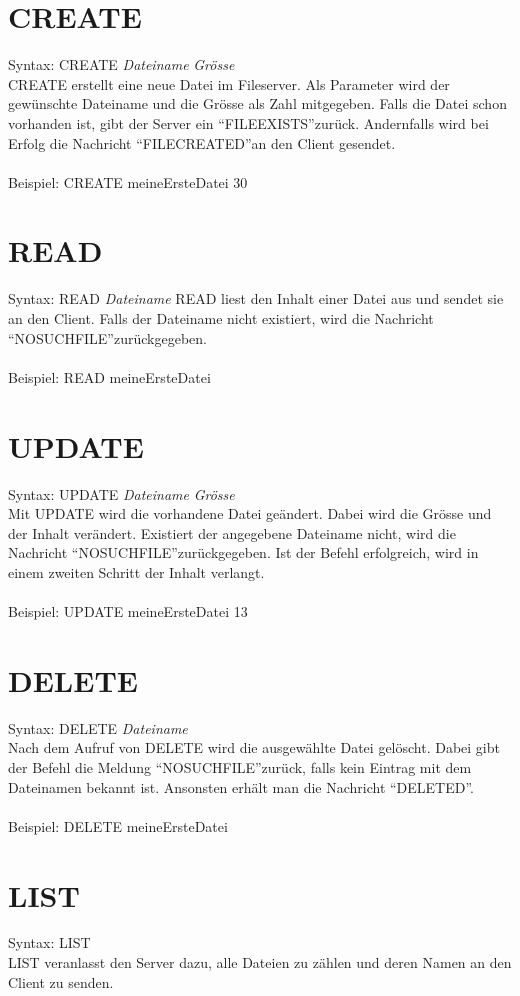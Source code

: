 \documentclass[12pt,a4paper,ngerman]{report}
\begin{document}
\section{CREATE}
Syntax: CREATE \textit{Dateiname} \textit{Grösse} \\
CREATE erstellt eine neue Datei im Fileserver. Als Parameter wird der gewünschte Dateiname und die Grösse als Zahl mitgegeben. Falls die Datei schon vorhanden ist, gibt der Server ein \textquotedblleft FILEEXISTS\textquotedblright zurück. Andernfalls wird bei Erfolg die Nachricht \textquotedblleft FILECREATED\textquotedblright an den Client gesendet.\\
\\
Beispiel: CREATE meineErsteDatei 30
\section{READ}
Syntax: READ \textit{Dateiname}
READ liest den Inhalt einer Datei aus und sendet sie an den Client. Falls der Dateiname nicht existiert, wird die Nachricht \textquotedblleft NOSUCHFILE\textquotedblright zurückgegeben.\\
\\
Beispiel: READ meineErsteDatei
\section{UPDATE}
Syntax: UPDATE \textit{Dateiname} \textit{Grösse}\\
Mit UPDATE wird die vorhandene Datei geändert. Dabei wird die Grösse und der Inhalt verändert. Existiert der angegebene Dateiname nicht, wird die Nachricht \textquotedblleft NOSUCHFILE\textquotedblright zurückgegeben. Ist der Befehl erfolgreich, wird in einem zweiten Schritt der Inhalt verlangt.\\
\\
Beispiel: UPDATE meineErsteDatei 13
\section{DELETE}
Syntax: DELETE \textit{Dateiname}\\
Nach dem Aufruf von DELETE wird die ausgewählte Datei gelöscht. Dabei gibt der Befehl die Meldung \textquotedblleft NOSUCHFILE\textquotedblright zurück, falls kein Eintrag mit dem Dateinamen bekannt ist. Ansonsten erhält man die Nachricht \textquotedblleft DELETED\textquotedblright . \\
\\
Beispiel: DELETE meineErsteDatei
\section{LIST}
Syntax: LIST \\
LIST veranlasst den Server dazu, alle Dateien zu zählen und deren Namen an den Client zu senden.
\end{document}
